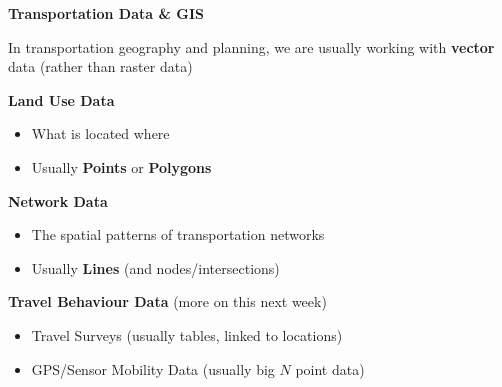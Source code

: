 \documentclass[aspectratio=169]{beamer}
\begin{document}
\begin{frame}
	
	\textbf{Transportation Data \& GIS}
	
	\vspace{2mm}
	
	In transportation geography and planning, we are usually working with \textbf{vector} data (rather than raster data)
	
	\vspace{2mm}
	
	\textbf{Land Use Data}
	
	\begin{itemize}
		\item What is located where
		\item Usually \textbf{Points} or \textbf{Polygons}
	\end{itemize}

	\vspace{2mm}
	
	\textbf{Network Data}
	
	\begin{itemize}
		\item The spatial patterns of transportation networks 
		\item Usually \textbf{Lines} (and nodes/intersections)
	\end{itemize}

	\vspace{2mm}

	\textbf{Travel Behaviour Data} (more on this next week)
	
	\begin{itemize}
		
		\item Travel Surveys (usually tables, linked to locations)
		\item GPS/Sensor Mobility Data (usually big $N$ point data)

	\end{itemize}
		
\end{frame}
\end{document}
